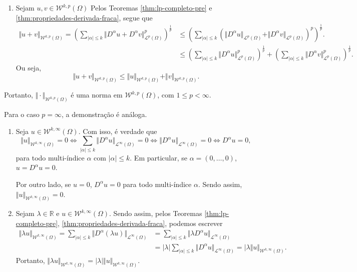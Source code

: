 \documentclass[a4paper, 11pt]{book}
\theoremstyle{definition}
\newcommand{\bR}{\mathbb{R}}
\newcommand{\cL}{\mathcal{L}}
\newcommand{\cW}{\mathcal{W}}
\begin{document}
\begin{prf}
\begin{enumerate}[leftmargin=*]
        \item Sejam $u, v \in \cW^{k,p}(\Omega)$ Pelos Teoremas \ref{thm:lp-completo-pre} e \ref{thm:propriedades-derivada-fraca}, segue que
        {\small
        \[
            \begin{aligned}
                \Vert u + v \Vert_{\cW^{k,p}(\Omega)} = \left(\sum_{|\alpha| \leqslant k} \Vert D^\alpha u + D^\alpha v \Vert_{\cL^p(\Omega)}^p\right)^{\!\!\frac{1}{p}} &\leqslant \left(\sum_{|\alpha| \leqslant k} \left(\Vert D^\alpha u \Vert_{\cL^p(\Omega)} + \Vert D^\alpha v \Vert_{\cL^p(\Omega)}\right)^p \right)^{\!\!\frac{1}{p}}.\\
            &\leqslant \left( \sum_{|\alpha| \leqslant k} \Vert D^\alpha u \Vert_{\cL^p(\Omega)}^p \right)^{\!\!\frac{1}{p}} + \left( \sum_{|\alpha| \leqslant k} \Vert D^\alpha v \Vert_{\cL^p(\Omega)}^p \right)^{\!\!\frac{1}{p}}.
            \end{aligned}
        \]}\!
        Ou seja,
        \[
            \Vert u + v \Vert_{\cW^{k,p}(\Omega)} \leqslant \Vert u \Vert_{\cW^{k,p}(\Omega)} + \Vert v \Vert_{\cW^{k,p}(\Omega)}.
        \]
    \end{enumerate}
    Portanto, $\Vert \cdot \Vert_{\cW^{k,p}(\Omega)}$ é uma norma em $\cW^{k,p}(\Omega)$, com $1 \leqslant p < \infty$.

    Para o caso $p = \infty$, a demonstração é análoga.
    \begin{enumerate}[leftmargin=*]
        \item Seja $u \in \cW^{k,\infty}(\Omega)$. Com isso, é verdade que
        \[
            \Vert u \Vert_{\cW^{k,\infty}(\Omega)} = 0 \iff \sum_{|\alpha| \leqslant k} \Vert D^\alpha u \Vert_{\cL^\infty(\Omega)} = 0 \iff \Vert D^\alpha u \Vert_{\cL^\infty(\Omega)} = 0 \iff D^\alpha u = 0,
        \]
        para todo multi-índice $\alpha$ com $|\alpha| \leqslant k$.
        Em particular, se $\alpha = (0,\dots,0)$, $u = D^\alpha u = 0$.

        Por outro lado, se $u = 0$, $D^\alpha u = 0$ para todo multi-índice $\alpha$. Sendo assim, $\Vert u \Vert_{\cW^{k,\infty}(\Omega)} = 0$.

        \item Sejam $\lambda \in \bR$ e $u \in \cW^{k,\infty}(\Omega)$. Sendo assim, pelos Teoremas \ref{thm:lp-completo-pre}, \ref{thm:propriedades-derivada-fraca}, podemos escrever
        \[
            \begin{aligned}
                \Vert \lambda u \Vert_{\cW^{k,\infty}(\Omega)} = \sum_{|\alpha| \leqslant k} \Vert D^\alpha (\lambda u) \Vert_{\cL^\infty(\Omega)} &= \sum_{|\alpha| \leqslant k} \Vert \lambda D^\alpha u \Vert_{\cL^\infty(\Omega)}\\ 
                &= |\lambda|\sum_{|\alpha| \leqslant k} \Vert D^\alpha u \Vert_{\cL^\infty(\Omega)} = |\lambda\Vert u \Vert_{\cW^{k,\infty}(\Omega)}.
            \end{aligned}
        \]
        Portanto, $\Vert \lambda u \Vert_{\cW^{k,\infty}(\Omega)} = |\lambda|\Vert u \Vert_{\cW^{k,\infty}(\Omega)}$.


\end{enumerate}
\end{prf}
\end{document}
